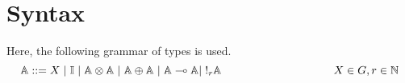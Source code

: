 
\section{Syntax}

Here, the following grammar of types is used.
\begin{equation*} \label{eq:grammar_graded}
  \centering
   \mathbb{A} ::= X  \hspace{3 pt} \vert \hspace{3 pt} \mathbb{I}  \hspace{3 pt}  \vert \hspace{3 pt} \mathbb{A}  \otimes  \mathbb{A} \hspace{3 pt} \vert \hspace{3 pt} \mathbb{A} \oplus \mathbb{A} \hspace{3 pt}  \vert \hspace{3 pt}   \mathbb{A} \multimap  \mathbb{A} \vert \hspace{3 pt} !_{r} \mathbb{A} \hspace{100pt} {X \in G,r \in \mathbb{N}} 
  \end{equation*}


